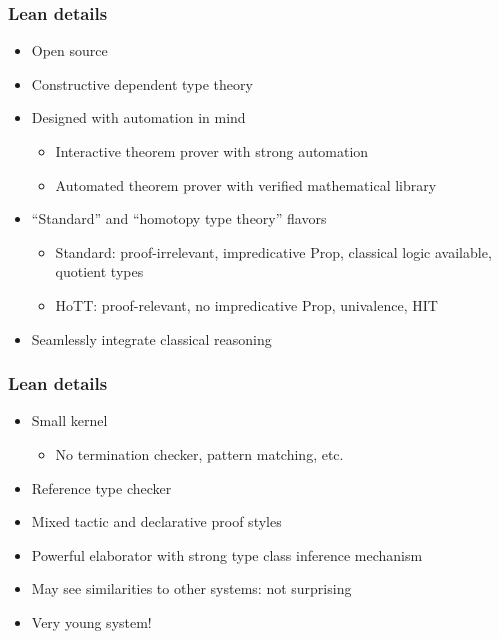 \documentclass{beamer}
\begin{document}
\begin{frame}
\frametitle{Lean details}
\begin{itemize}
\item Open source
\item Constructive dependent type theory
\item Designed with automation in mind
\begin{itemize}
\item Interactive theorem prover with strong automation
\item Automated theorem prover with verified mathematical library
\end{itemize}
\item ``Standard'' and ``homotopy type theory'' flavors
\begin{itemize}
\item Standard: proof-irrelevant, impredicative Prop, classical logic available, quotient types
\item HoTT: proof-relevant, no impredicative Prop, univalence, HIT
\end{itemize}
\item Seamlessly integrate classical reasoning
\end{itemize}

\end{frame}

\begin{frame}
\frametitle{Lean details}

\begin{itemize}
\item Small kernel
\begin{itemize}
\item No termination checker, pattern matching, etc.
\end{itemize}
\item Reference type checker
\item Mixed tactic and declarative proof styles
\item Powerful elaborator with strong type class inference mechanism
\item May see similarities to other systems: not surprising

\vspace{.5cm}

\item Very young system!
\end{itemize}

\end{frame}
\end{document}
